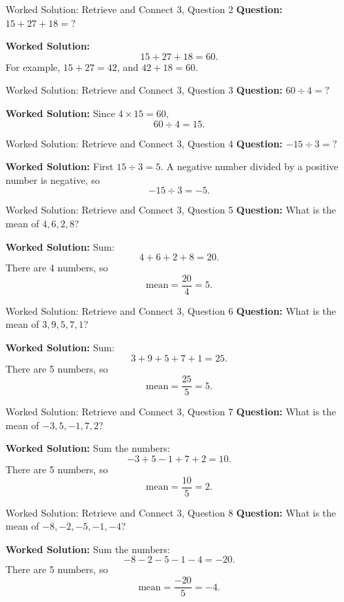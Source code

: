 \documentclass{beamer}
\begin{document}
\begin{frame}{Worked Solution: Retrieve and Connect 3, Question 2}
\textbf{Question:} \(15 + 27 + 18 = ?\)

\textbf{Worked Solution:}
\[
15 + 27 + 18 = 60.
\]
For example, \(15 + 27 = 42\), and \(42 + 18 = 60\).
\end{frame}

\begin{frame}{Worked Solution: Retrieve and Connect 3, Question 3}
\textbf{Question:} \(60 \div 4 = ?\)

\textbf{Worked Solution:}
Since \(4 \times 15 = 60\),
\[
60 \div 4 = 15.
\]
\end{frame}

\begin{frame}{Worked Solution: Retrieve and Connect 3, Question 4}
\textbf{Question:} \(-15 \div 3 = ?\)

\textbf{Worked Solution:}
First \(15 \div 3 = 5\).
A negative number divided by a positive number is negative, so
\[
-15 \div 3 = -5.
\]
\end{frame}

\begin{frame}{Worked Solution: Retrieve and Connect 3, Question 5}
\textbf{Question:} What is the mean of \(4, 6, 2, 8\)?

\textbf{Worked Solution:}
Sum:
\[
4 + 6 + 2 + 8 = 20.
\]
There are 4 numbers, so
\[
\text{mean} = \frac{20}{4} = 5.
\]
\end{frame}

\begin{frame}{Worked Solution: Retrieve and Connect 3, Question 6}
\textbf{Question:} What is the mean of \(3, 9, 5, 7, 1\)?

\textbf{Worked Solution:}
Sum:
\[
3 + 9 + 5 + 7 + 1 = 25.
\]
There are 5 numbers, so
\[
\text{mean} = \frac{25}{5} = 5.
\]
\end{frame}

\begin{frame}{Worked Solution: Retrieve and Connect 3, Question 7}
\textbf{Question:} What is the mean of \(-3, 5, -1, 7, 2\)?

\textbf{Worked Solution:}
Sum the numbers:
\[
-3 + 5 - 1 + 7 + 2 = 10.
\]
There are 5 numbers, so
\[
\text{mean} = \frac{10}{5} = 2.
\]
\end{frame}

\begin{frame}{Worked Solution: Retrieve and Connect 3, Question 8}
\textbf{Question:} What is the mean of \(-8, -2, -5, -1, -4\)?

\textbf{Worked Solution:}
Sum the numbers:
\[
-8 - 2 - 5 - 1 - 4 = -20.
\]
There are 5 numbers, so
\[
\text{mean} = \frac{-20}{5} = -4.
\]
\end{frame}
\end{document}
